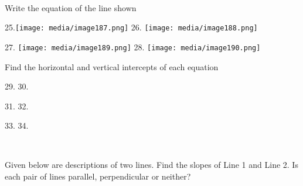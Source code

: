 \begin{enumerate}
~

Write the equation of the line shown

25.\texttt{[image: media/image187.png]}
26.
\texttt{[image: media/image188.png]}

27.
\texttt{[image: media/image189.png]}
28.
\texttt{[image: media/image190.png]}

Find the horizontal and vertical intercepts of each equation

29. 30.

31. 32.

33. 34.

~

Given below are descriptions of two lines. Find the slopes of Line 1 and
Line 2. Is each pair of lines parallel, perpendicular or neither?


\end{enumerate}
